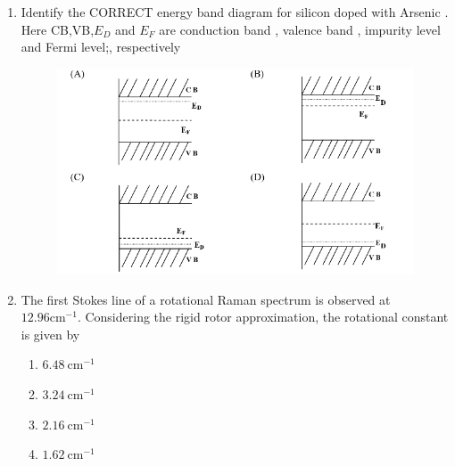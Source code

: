 \documentclass[journal,12pt,onecolumn]{IEEEtran}
\theoremstyle{remark}
\begin{document}
\begin{enumerate}
where, $\varepsilon$ is the eccentricity of the particle motion. Which one of the following choices for $\varepsilon$ gives rise to a parabolic trajectory?
\begin{multicols}{4}
\begin{enumerate}
\item $\varepsilon = 0$
\item $\varepsilon = 1$
\item $0 < \varepsilon < 1$
\item $\varepsilon > 1$
\end{enumerate}
\end{multicols}
\newpage
\item Identify the CORRECT energy band diagram for silicon doped with Arsenic . Here CB,VB,$E_D$ and $E_F$ are conduction band , valence band , impurity level and Fermi level;, respectively
\begin{figure}[H]
    \centering
    \includegraphics[width = 1\columnwidth]{fig/Q15.png}
    \caption*{}
    \label{fig:Q15}
\end{figure}  

\item The first Stokes line of a rotational Raman spectrum is observed at $12.96\mathrm{cm^{-1}}$. Considering the rigid rotor approximation, the rotational constant is given by
\begin{multicols}{4}
\begin{enumerate}
\item $6.48\ \mathrm{cm^{-1}}$
\item $3.24\ \mathrm{cm^{-1}}$
\item $2.16\ \mathrm{cm^{-1}}$
\item $1.62\ \mathrm{cm^{-1}}$
\end{enumerate}
\end{multicols}


\end{enumerate}
\end{document}
